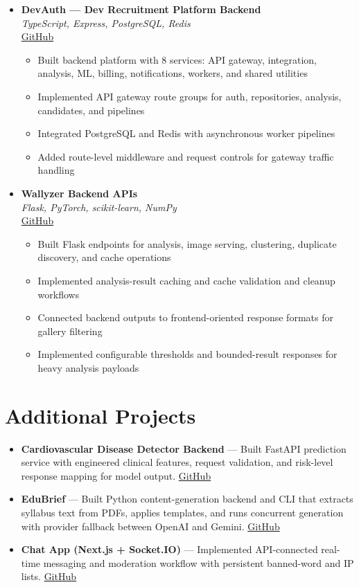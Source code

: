 \documentclass[11pt,a4paper]{article}
\newcommand{\resumeItem}[1]{
  \item\small{#1 \vspace{-1pt}}
}
\begin{document}
\begin{itemize}[leftmargin=*]
\item \textbf{DevAuth --- Dev Recruitment Platform Backend} \\
\textit{TypeScript, Express, PostgreSQL, Redis} \\
\href{https://github.com/Dhairya3391/devAuth}{GitHub}
\begin{itemize}[leftmargin=*]
  \resumeItem{Built backend platform with 8 services: API gateway, integration, analysis, ML, billing, notifications, workers, and shared utilities}
  \resumeItem{Implemented API gateway route groups for auth, repositories, analysis, candidates, and pipelines}
  \resumeItem{Integrated PostgreSQL and Redis with asynchronous worker pipelines}
  \resumeItem{Added route-level middleware and request controls for gateway traffic handling}
\end{itemize}

\item \textbf{Wallyzer Backend APIs} \\
\textit{Flask, PyTorch, scikit-learn, NumPy} \\
\href{https://github.com/Dhairya3391/wallyzer}{GitHub}
\begin{itemize}[leftmargin=*]
  \resumeItem{Built Flask endpoints for analysis, image serving, clustering, duplicate discovery, and cache operations}
  \resumeItem{Implemented analysis-result caching and cache validation and cleanup workflows}
  \resumeItem{Connected backend outputs to frontend-oriented response formats for gallery filtering}
  \resumeItem{Implemented configurable thresholds and bounded-result responses for heavy analysis payloads}
\end{itemize}

\end{itemize}

\section{Additional Projects}
\begin{itemize}[leftmargin=*]
  \resumeItem{\textbf{Cardiovascular Disease Detector Backend} --- Built FastAPI prediction service with engineered clinical features, request validation, and risk-level response mapping for model output. \href{https://github.com/Dhairya3391/Cardiovascular-Disease-Detector-Backend}{GitHub}}
  \resumeItem{\textbf{EduBrief} --- Built Python content-generation backend and CLI that extracts syllabus text from PDFs, applies templates, and runs concurrent generation with provider fallback between OpenAI and Gemini. \href{https://github.com/Dhairya3391/EduBrief}{GitHub}}
  \resumeItem{\textbf{Chat App (Next.js + Socket.IO)} --- Implemented API-connected real-time messaging and moderation workflow with persistent banned-word and IP lists. \href{https://github.com/Dhairya3391/chat-app-next}{GitHub}}
\end{itemize}
\end{document}

